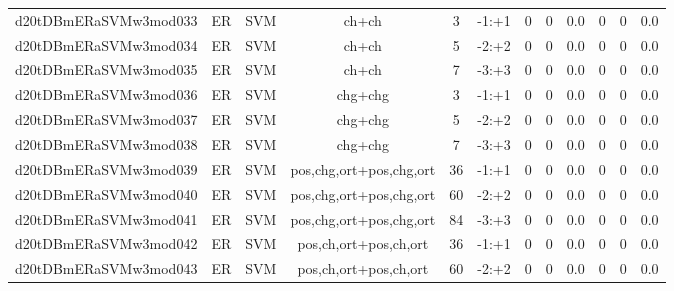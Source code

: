 \documentclass[a4paper]{article}
\begin{document}
\begin{landscape}
\begin{center}
\begin{tabular}{ |c|c|c|c|c|c|c|c|c|c|c|c|}
 	

 
 	
 	\small{ d20tDBmERaSVMw3mod033 } & ER & SVM & ch+ch  &  3 &  -1:+1  &  0 & 0 & 0.0  &  0 & 0 & 0.0 \\
 	

 
 	
 	\small{ d20tDBmERaSVMw3mod034 } & ER & SVM & ch+ch  &  5 &  -2:+2  &  0 & 0 & 0.0  &  0 & 0 & 0.0 \\
 	

 
 	
 	\small{ d20tDBmERaSVMw3mod035 } & ER & SVM & ch+ch  &  7 &  -3:+3  &  0 & 0 & 0.0  &  0 & 0 & 0.0 \\
 	

 
 	
 	\small{ d20tDBmERaSVMw3mod036 } & ER & SVM & chg+chg  &  3 &  -1:+1  &  0 & 0 & 0.0  &  0 & 0 & 0.0 \\
 	

 
 	
 	\small{ d20tDBmERaSVMw3mod037 } & ER & SVM & chg+chg  &  5 &  -2:+2  &  0 & 0 & 0.0  &  0 & 0 & 0.0 \\
 	

 
 	
 	\small{ d20tDBmERaSVMw3mod038 } & ER & SVM & chg+chg  &  7 &  -3:+3  &  0 & 0 & 0.0  &  0 & 0 & 0.0 \\
 	

 
 	
 	\small{ d20tDBmERaSVMw3mod039 } & ER & SVM & pos,chg,ort+pos,chg,ort  &  36 &  -1:+1  &  0 & 0 & 0.0  &  0 & 0 & 0.0 \\
 	

 
 	
 	\small{ d20tDBmERaSVMw3mod040 } & ER & SVM & pos,chg,ort+pos,chg,ort  &  60 &  -2:+2  &  0 & 0 & 0.0  &  0 & 0 & 0.0 \\
 	

 
 	
 	\small{ d20tDBmERaSVMw3mod041 } & ER & SVM & pos,chg,ort+pos,chg,ort  &  84 &  -3:+3  &  0 & 0 & 0.0  &  0 & 0 & 0.0 \\
 	

 
 	
 	\small{ d20tDBmERaSVMw3mod042 } & ER & SVM & pos,ch,ort+pos,ch,ort  &  36 &  -1:+1  &  0 & 0 & 0.0  &  0 & 0 & 0.0 \\
 	

 
 	
 	\small{ d20tDBmERaSVMw3mod043 } & ER & SVM & pos,ch,ort+pos,ch,ort  &  60 &  -2:+2  &  0 & 0 & 0.0  &  0 & 0 & 0.0 \\
 	


\end{tabular}
\end{center}
\end{landscape}
\end{document}

